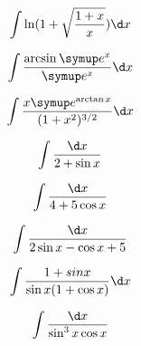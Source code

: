 \begin{question}
    \begin{equation*}
        \int \ln(1 + \sqrt{\frac{1 + x}{x}}) \d x
    \end{equation*}
\end{question}

\begin{question}
    \begin{equation*}
        \int \frac{\arcsin \me^x}{\me^x} \d x
    \end{equation*}
\end{question}

\begin{question}
    \begin{equation*}
        \int \frac{x \me^{\arctan x}}{(1 + x^2)^{3/2}} \d x
    \end{equation*}
\end{question}

\begin{question}
    \begin{equation*}
        \int \frac{\d x}{2 + \sin x}
    \end{equation*}
\end{question}

\begin{question}
    \begin{equation*}
        \int \frac{\d x}{4 + 5 \cos x}
    \end{equation*}
\end{question}

\begin{question}
    \begin{equation*}
        \int \frac{\d x}{2\sin x - \cos x + 5}
    \end{equation*}
\end{question}

\begin{question}
    \begin{equation*}
        \int \frac{1 + sin x}{\sin x (1 + \cos x)} \d x
    \end{equation*}
\end{question}

\begin{question}
    \begin{equation*}
        \int \frac{\d x}{\sin^3 x \cos x}
    \end{equation*}
\end{question}

